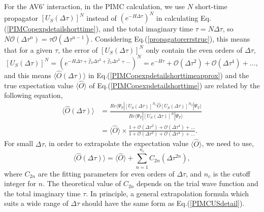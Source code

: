 \documentclass[12pt,letterpaper,UTF8]{report}
\begin{document}
For the AV6' interaction, in the PIMC calculation, we use $N$ short-time propagator $[U_S(\Delta \tau)]^N$ instead of $(e^{-H \Delta \tau})^N$ in calculating Eq.(\ref{PIMCopexpdetailshorttime}),
and the total imaginary time $\tau=N\Delta \tau$, so $N\mathcal{O}(\Delta \tau^n)=\tau \mathcal{O}(\Delta \tau^{n-1})$.
Considering Eq.(\ref{propagatorerrstruc}), this means that for a given $\tau$, the error of $[U_S(\Delta \tau)]^N$ only contain the even orders of $\Delta \tau$,
\begin{equation}
\left[U_S(\Delta \tau)\right]^N =
\left(e^{ -H \Delta \tau
+ \hat{f}_3 \Delta \tau^3
+ \hat{f}_5 \Delta \tau^5 + ... }\right)^N
=e^{-H \tau} + \mathcal{O}(\Delta \tau^2) + \mathcal{O}(\Delta \tau^4) + ... ,
\label{propagatorNerrstruc}
\end{equation}
and this means
$\langle \hat{O} (\Delta \tau) \rangle$ in Eq.(\ref{PIMCopexpdetailshorttimeapprox}) and the true expectation value $\langle \hat{O} \rangle$ of Eq.(\ref{PIMCopexpdetailshorttime}) are related by the following equation,
\begin{align}
\langle \hat{O} (\Delta \tau) \rangle
& = \frac{ Re  \langle \Psi_T| [U_S(\Delta \tau)]^{N_1} \hat{O} [U_S(\Delta \tau)]^{N_2}| \Psi_T \rangle  }
{ Re \langle \Psi_T| [U_S(\Delta \tau)]^{N} | \Psi_T \rangle} \nonumber \\
& = \langle \hat{O} \rangle \times
\frac{1 + \mathcal{O}(\Delta \tau^2) + \mathcal{O}(\Delta \tau^4) + ... }
{1+ \mathcal{O}(\Delta \tau^2) + \mathcal{O}(\Delta \tau^4) + ... } .
\label{PIMCUSdetail}
\end{align}
For small $\Delta\tau$, in order to extrapolate the expectation value $\langle \hat{O} \rangle$, we need to use,
\begin{equation}
\langle \hat{O} (\Delta \tau) \rangle
= \langle \hat{O} \rangle
+ \sum_{n=1}^{n_c} C_{2n} (\Delta \tau^{2n}),
\label{Oextrapolation}
\end{equation}
where $C_{2n}$ are the fitting parameters for even orders of $\Delta \tau$, and $n_c$ is the cutoff integer for $n$. The theoretical value of $C_{2n}$ depends on the trial wave function and the total imaginary time $\tau$.
In principle, a general extrapolation formula which suits a wide range of $\Delta \tau$ should have the same form as Eq.(\ref{PIMCUSdetail}).
\end{document}
